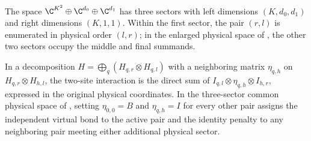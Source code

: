 \begin{definition}
    \label{def:spt_physical_spectator_coordinates}
    \leanok
    The space $\C^{K^2}\oplus\C^{d_0}\oplus\C^{d_1}$ has three
    sectors with left dimensions $(K,d_0,d_1)$ and right dimensions
    $(K,1,1)$. Within the first sector, the pair $(r,l)$ is enumerated
    in physical order $(l,r)$; in the enlarged physical space of
    \cite[Section~II.F.2]{Schuch2011Phases}, the other two sectors occupy
    the middle and final summands.
\end{definition}

\begin{definition}
    \label{def:spt_sector_bond_interaction}
    \leanok
    In a decomposition $H=\bigoplus_q(H_{q,r}\otimes H_{q,l})$ with a
    neighboring matrix $\eta_{q,h}$ on $H_{q,r}\otimes H_{h,l}$, the
    two-site interaction is the direct sum of
    $I_{q,l}\otimes\eta_{q,h}\otimes I_{h,r}$, expressed in the original
    physical coordinates. In the three-sector common physical space of
    \cite[Sections~II.D.2 and II.F.2]{Schuch2011Phases}, setting
    $\eta_{0,0}=B$ and $\eta_{q,h}=I$ for every other pair assigns the
    independent virtual bond to the active pair and the identity penalty to
    any neighboring pair meeting either additional physical sector.
\end{definition}

